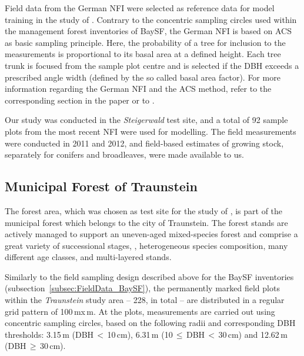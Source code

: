 Field data from the German \ac{NFI} were selected as reference data for 
model training in the study of \textcite{Immitzer.2016}.
Contrary to the concentric sampling circles used within the management forest inventories of \ac{BaySF},
the German \ac{NFI} is based on \acf{ACS} as basic sampling principle. Here, the probability of a tree for inclusion to the measurements
is proportional to its basal area at a defined height. Each tree trunk is focused from the sample plot centre and is 
selected if the \ac{DBH} exceeds a prescribed angle width (defined by the so called basal area factor). 
For more information regarding the German \ac{NFI} and the \ac{ACS} method, refer to the corresponding section in the 
paper \parencite{Immitzer.2016} or to \textcite{Polley.2010}.

 Our study was conducted in the \emph{Steigerwald} test site, 
 and a total of 92 sample plots from the most recent \ac{NFI} were used for modelling. 
 The field measurements were conducted in 2011 and 2012, 
 and field-based estimates of growing stock, separately for conifers and broadleaves, 
 were made available to us. 

\subsection{Municipal Forest of Traunstein}\label{subsec:FieldData_Traunstein}

The forest area, which was chosen as test site for the study of \textcite{Stepper.2015}, is part of the municipal forest which belongs 
to the city of Traunstein. 
The forest stands are actively managed to support an uneven-aged mixed-species forest and comprise a 
great variety of successional stages, \ie, heterogeneous species composition, many different age classes, and multi-layered stands.

Similarly to the field sampling design described above for the \ac{BaySF} inventories (subsection~\ref{subsec:FieldData_BaySF}), 
the permanently marked field plots within the \emph{Traunstein} study area -- 228, in total -- are distributed in a regular grid pattern of 100\,m\;x\,m.
At the plots, measurements are carried out using concentric sampling circles, 
based on the following radii and corresponding \ac{DBH} thresholds:
3.15\,m (\ac{DBH}\,$<$\,10\,cm), 6.31\,m (10\,$\leq$\,\ac{DBH}\,$<$\,30\,cm) and 12.62\,m (\ac{DBH}\,$\geq$\,30\,cm).

